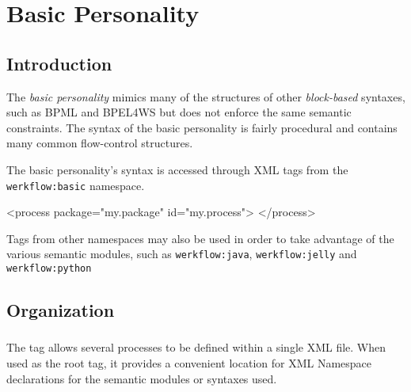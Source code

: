 
\chapter{Basic Personality}


\section{Introduction}

The \emph{basic personality} mimics many of the structures
of other \emph{block-based} syntaxes, such as BPML and BPEL4WS
but does not enforce the same semantic constraints.  The syntax of
the basic personality is fairly procedural and contains many common
flow-control structures.

The basic personality's syntax is accessed through XML tags from
the \verb|werkflow:basic| namespace.

\begin{codelisting}
<process 
         package="my.package"
         id="my.process">
</process>
\end{codelisting}

Tags from other namespaces may also be used in order to 
take advantage of the various semantic modules, such
as \verb|werkflow:java|, \verb|werkflow:jelly| and 
\verb|werkflow:python|


\section{Organization}

\subsection{}

The  tag allows several processes to be defined
within a single XML file.  When used as the root tag, it provides
a convenient location for XML Namespace declarations for the semantic
modules or syntaxes used.


